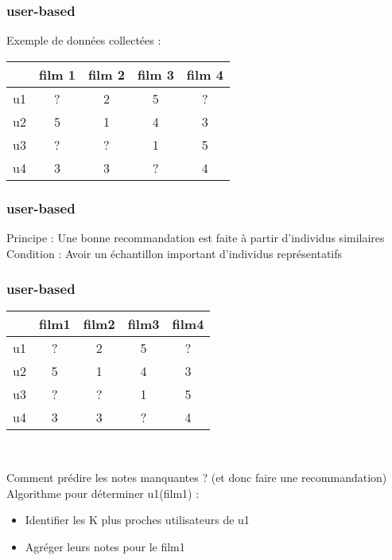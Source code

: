 \begin{frame}
  \frametitle{user-based}
  Exemple de données collectées :
  \begin{center}
  \begin{tabular}{|l|c|c|c|c|}
    \hline
     & film 1 & film 2 & film 3 & film 4 \\
    \hline
    u1 & ? & 2 & 5 & ? \\
    \hline
    u2 & 5 & 1 & 4 & 3 \\
    \hline
    u3 & ? & ? & 1 & 5 \\
    \hline
    u4 & 3 & 3 & ? & 4 \\
    \hline
  \end{tabular}
  \end{center}
\end{frame}

\begin{frame}
  \frametitle{user-based}
  Principe : Une bonne recommandation est faite à partir d'individus similaires\\
  \newline
  Condition : Avoir un échantillon important d'individus représentatifs
\end{frame}

\begin{frame}
  \frametitle{user-based}
  \begin{center}
    \begin{tabular}{|l|c|c|c|c|}
      \hline
      & film1 & film2 & film3 & film4 \\
      \hline
      u1 & ? & 2 & 5 & ? \\
      \hline
      u2 & 5 & 1 & 4 & 3 \\
    \hline
    u3 & ? & ? & 1 & 5 \\
    \hline
    u4 & 3 & 3 & ? & 4 \\
    \hline
    \end{tabular}\\
    \end{center}
  Comment prédire les notes manquantes ? (et donc faire une recommandation) \\
  \newline
  Algorithme pour déterminer u1(film1) :
  \begin{itemize}
  \item Identifier les K plus proches utilisateurs de u1
  \item Agréger leurs notes pour le film1
  \end{itemize}
\end{frame}

